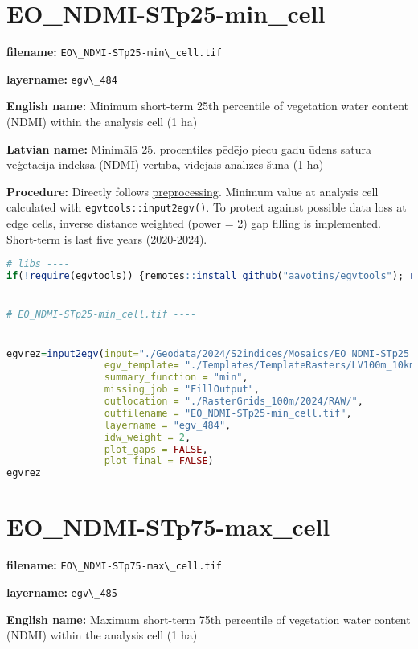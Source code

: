 \documentclass[
]{book}
\newcommand{\passthrough}[1]{#1}
\begin{document}
\section{EO\_NDMI-STp25-min\_cell}\label{ch06.484}

\textbf{filename:} \passthrough{\lstinline!EO\_NDMI-STp25-min\_cell.tif!}

\textbf{layername:} \passthrough{\lstinline!egv\_484!}

\textbf{English name:} Minimum short-term 25th percentile of vegetation water content (NDMI) within the analysis cell (1 ha)

\textbf{Latvian name:} Minimālā 25. procentiles pēdējo piecu gadu ūdens satura veģetācijā indeksa (NDMI) vērtība, vidējais analīzes šūnā (1 ha)

\textbf{Procedure:} Directly follows \hyperref[Ch04.13]{preprocessing}. Minimum value at analysis cell
calculated with \passthrough{\lstinline!egvtools::input2egv()!}. To protect against possible data loss at edge cells,
inverse distance weighted (power = 2) gap filling is implemented. Short-term is last five years (2020-2024).

\begin{lstlisting}[language=R]
# libs ----
if(!require(egvtools)) {remotes::install_github("aavotins/egvtools"); require(egvtools)}


# EO_NDMI-STp25-min_cell.tif ----


egvrez=input2egv(input="./Geodata/2024/S2indices/Mosaics/EO_NDMI-STp25.tif",
                 egv_template= "./Templates/TemplateRasters/LV100m_10km.tif",
                 summary_function = "min",
                 missing_job = "FillOutput",
                 outlocation = "./RasterGrids_100m/2024/RAW/",
                 outfilename = "EO_NDMI-STp25-min_cell.tif",
                 layername = "egv_484",
                 idw_weight = 2,
                 plot_gaps = FALSE,
                 plot_final = FALSE)
egvrez
\end{lstlisting}

\section{EO\_NDMI-STp75-max\_cell}\label{ch06.485}

\textbf{filename:} \passthrough{\lstinline!EO\_NDMI-STp75-max\_cell.tif!}

\textbf{layername:} \passthrough{\lstinline!egv\_485!}

\textbf{English name:} Maximum short-term 75th percentile of vegetation water content (NDMI) within the analysis cell (1 ha)
\end{document}
